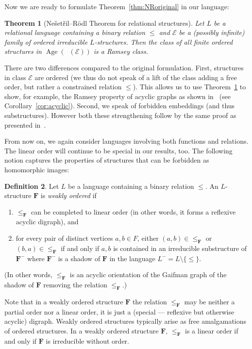 \documentclass{elsarticle}
\def\Forbi{\mathop{\mathrm{Forb_e}}\nolimits}
\def\Age{\mathop{\mathrm{Age}}\nolimits}
\def\str#1{\mathbf {#1}}
\theoremstyle{plain}
\newtheorem{theorem}{Theorem}[section]
\theoremstyle{definition}
\newtheorem{definition}[theorem]{Definition}
\theoremstyle{remark}
\begin{document}
Now we are ready to formulate Theorem~\ref{thm:NRoriginal} in our language:
\begin{theorem}[Ne\v set\v ril--R\"odl Theorem for relational structures]
\label{thm:NR}
Let $L$  be a relational language containing a binary relation $\leq$
and $\mathcal E$ be a (possibly infinite) family of ordered irreducible $L$-struc\-tures.
Then the class of all finite ordered structures in $\Age(\Forbi(\mathcal E))$ is a Ramsey class.
\end{theorem}
There are two differences compared to the original formulation.
First, structures in class $\mathcal E$ are ordered (we thus do not speak of a lift of the class adding a free order, but rather a constrained relation $\leq$).  This allows us to use
Theorem~\ref{thm:NR}  to show, for example, the Ramsey property of acyclic graphs as shown in~\cite{Nevsetvril1984} (see Corollary~\ref{cor:acyclic}).  Second, we speak of forbidden embeddings (and
thus substructures). However both these strengthening follow by the same proof as presented in~\cite{Nevsetvril1989}.

\medskip

From now on, we again consider languages involving both functions and relations.
The linear order will continue to be special in our results, too. The following
notion captures the properties of structures that can be forbidden as homomorphic images:
\begin{definition}
\label{defn:weakorder}
Let $L$ be a language containing a binary relation $\leq$.
An $L$-structure $\str{F}$ is \emph{weakly ordered} if 
\begin{enumerate}
\item $\leq_\str{F}$ can be completed to linear order (in other words, it forms a reflexive acyclic digraph), and
\item for every pair of distinct vertices $a, b\in F$, either $(a,b)\in \leq_\str{F}$ or $(b,a)\in \leq_\str{F}$
if and only if $a,b$ is contained in an irreducible substructure of $\str{F}^-$ where $\str{F}^-$ is a shadow of $\str{F}$
in the language $L^-=L\setminus \{\leq\}$.
\end{enumerate}
(In other words, $\leq_\str{F}$ is an acyclic orientation of the Gaifman graph of the shadow of $\str{F}$ removing the relation $\leq_\str{F}$.)
\end{definition}
Note that in a weakly ordered structure $\str{F}$ the relation $\leq_\str{F}$ may be neither a partial order nor a
linear order, it is just a (special --- reflexive but otherwise acyclic) digraph. Weakly ordered structures typically arise as free
amalgamations of ordered structures.  In a weakly ordered structure $\str{F}$,
$\leq_\str{F}$ is a linear order if and only if $\str{F}$ is irreducible without order.
\end{document}
